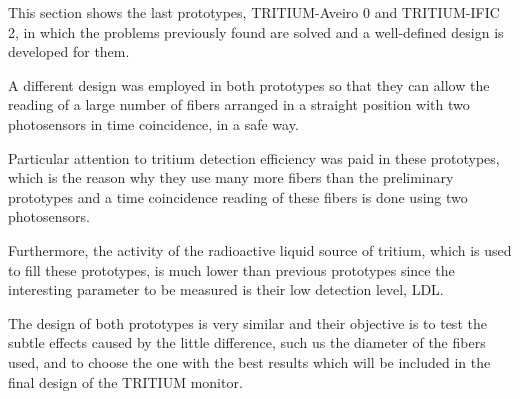 This section shows the last prototypes, TRITIUM-Aveiro 0 and TRITIUM-IFIC 2, in which the problems previously found are solved and a well-defined design is developed for them.

A different design was employed in both prototypes so that they can allow the reading of a large number of fibers arranged in a straight position with two photosensors in time coincidence, in a safe way.

Particular attention to tritium detection efficiency was paid in these prototypes, which is the reason why they use many more fibers than the preliminary prototypes and a time coincidence reading of these fibers is done using two photosensors.

Furthermore, the activity of the radioactive liquid source of tritium, which is used to fill these prototypes, is much lower than previous prototypes since the interesting parameter to be measured is their low detection level, LDL.

The design of both prototypes is very similar and their objective is to test the subtle effects caused by the little difference, such us the diameter of the fibers used, and to choose the one with the best results which will be included in the final design of the TRITIUM monitor.